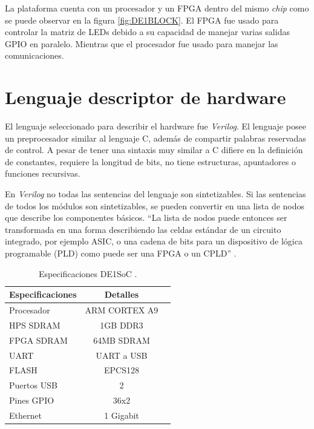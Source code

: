 La plataforma cuenta con un procesador y un FPGA dentro del mismo \textit{chip} como se puede observar en la figura  \ref{fig:DE1BLOCK}. El FPGA fue usado para controlar la matriz de LEDs debido a su capacidad de manejar varias salidas GPIO en paralelo. Mientras que el procesador fue usado para manejar las comunicaciones.




\section{Lenguaje descriptor de hardware}



El lenguaje seleccionado para describir el hardware fue \textit{Verilog}. El lenguaje posee un preprocesador similar al lenguaje C, además de compartir palabras reservadas de control. A pesar de tener una sintaxis muy similar a C difiere en la definición de constantes, requiere la longitud de bits, no tiene estructuras, apuntadores o funciones recursivas. 

En \textit{Verilog} no todas las sentencias del lenguaje son sintetizables. Si las sentencias de todos los módulos son sintetizables, se pueden convertir en una lista de nodos que describe los componentes básicos. ``La lista de nodos puede entonces ser transformada en una forma describiendo las celdas estándar de un circuito integrado, por ejemplo ASIC, o una cadena de bits para un dispositivo de lógica programable (PLD) como puede ser una FPGA o un CPLD'' \citep{WIKIVERILOG}.

\begin{table}[h]
\centering
\caption[Especificaciones DE1SoC]{Especificaciones DE1SoC \protect\footnotemark.}
\begin{tabular}{l c c}
\toprule
\textbf{Especificaciones}& \textbf{Detalles}\\
\midrule 


Procesador & ARM CORTEX A9\\
HPS SDRAM & 1GB DDR3\\
FPGA SDRAM & 64MB SDRAM\\
UART & UART a USB\\
FLASH & EPCS128\\
Puertos USB & 2\\
Pines GPIO & 36x2\\
Ethernet & 1 Gigabit\\


\bottomrule
\hline
\end{tabular}
\label{tab:DE1SOCTABLA}
\end{table}

